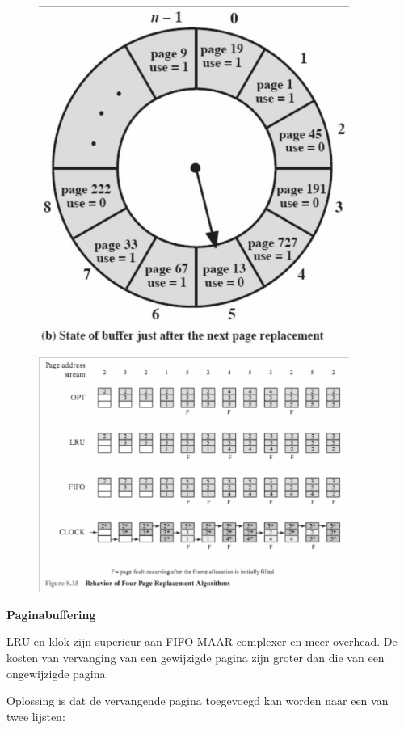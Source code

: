 \begin{figure}[htp]
    \centering
            \includegraphics[width=4in]{img/klok2}
        \caption{}
    \label{fig:}
\end{figure}

\begin{figure}[htp]
    \centering
            \includegraphics[width=4in]{img/pagereplacementalgoritm}
        \caption{}
    \label{fig:}
\end{figure}



\textbf{Paginabuffering}

LRU en klok zijn superieur aan FIFO MAAR complexer en meer overhead. De kosten van vervanging van een gewijzigde pagina zijn groter dan die van een ongewijzigde pagina.

Oplossing is dat de vervangende pagina toegevoegd kan worden naar een van twee lijsten:

